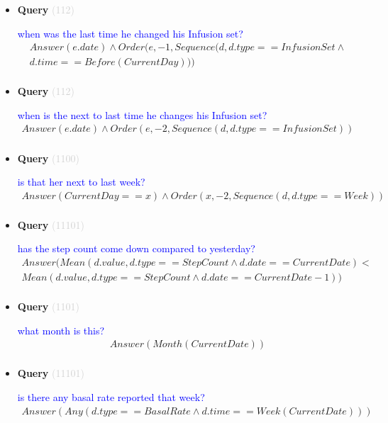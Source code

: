 \documentclass[11pt]{article}
\newcommand{\key}[1]{\textcolor{lightgray}{#1}}
\newcounter{CQuery}
\begin{document}
\begin{itemize}
\item
\textbf{Query\theCQuery} \key{(112)} \addtocounter{CQuery}{1}
\textcolor{blue}{ when was the last time he changed his Infusion set? }
\begin{multline*}
Answer(e.date) \wedge Order(e, -1, Sequence(d, d.type==InfusionSet\wedge \\ 
d.time==Before(CurrentDay))) \\ 
\end{multline*}


\item
\textbf{Query\theCQuery} \key{(112)} \addtocounter{CQuery}{1}
\textcolor{blue}{ when is the next to last time he changes his Infusion set? }
\begin{multline*}
Answer(e.date) \wedge Order(e, -2, Sequence(d, d.type==InfusionSet)) \\ 
\end{multline*}


\item
\textbf{Query\theCQuery} \key{(1100)} \addtocounter{CQuery}{1}
\textcolor{blue}{ is that her next to last week? }
\begin{multline*}
Answer(CurrentDay==x) \wedge Order(x, -2, Sequence(d, d.type==Week)) \\ 
\end{multline*}


\item
\textbf{Query\theCQuery} \key{(11101)} \addtocounter{CQuery}{1}
\textcolor{blue}{ has the step count come down compared to yesterday? }
\begin{multline*}
Answer(Mean(d.value, d.type==StepCount \wedge d.date==CurrentDate) < \\ 
Mean(d.value, d.type==StepCount \wedge d.date==CurrentDate-1)) \\ 
\end{multline*}


\item
\textbf{Query\theCQuery} \key{(1101)} \addtocounter{CQuery}{1}
\textcolor{blue}{ what month is this? }
\begin{multline*}
Answer(Month(CurrentDate)) \\ 
\end{multline*}


\item
\textbf{Query\theCQuery} \key{(11101)} \addtocounter{CQuery}{1}
\textcolor{blue}{ is there any basal rate reported that week? }
\begin{multline*}
Answer(Any(d.type==BasalRate \wedge d.time==Week(CurrentDate))) \\ 
\end{multline*}



\end{itemize}
\end{document}
